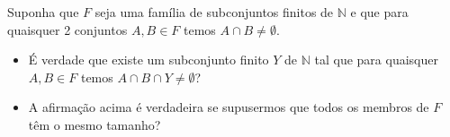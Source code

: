 Suponha que \(F\) seja uma família de subconjuntos finitos de \(\mathbb{N}\) e que para quaisquer 2 conjuntos \(A,B \in F\) temos \(A \cap B \not= \emptyset\).
\begin{itemize}

\item[(a)] É verdade que existe um subconjunto finito \(Y\) de \(\mathbb{N}\) tal que para quaisquer \(A,B \in F\) temos \(A\cap B\cap Y \not= \emptyset\)?
\item[(b)] A afirmação acima é verdadeira se supusermos que todos os membros de \(F\) têm o mesmo tamanho?
\end{itemize}
